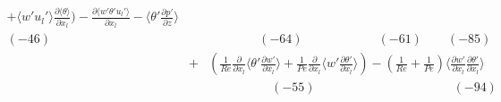 \documentclass[a4paper,11pt]{article}
\begin{document}
\begin{eqnarray}
+\langle w'u_l'\rangle \frac{\partial \langle \theta \rangle  }{\partial x_l})
-\frac{\partial \langle w'\theta'u_l'\rangle}{\partial x_l}  %
-\langle \theta' \frac{\partial p' }{\partial z}\rangle \nonumber \\
(-46) \quad{}   && \quad{} \qquad{} \quad{} (-64)\qquad{}\qquad{}\qquad{} (-61)\qquad{} (-85) \nonumber \\
&+&(\frac{1}{Re}\frac{\partial }{\partial x_l}\langle \theta' \frac{\partial w' }{\partial x_l}\rangle+\frac{1}{Pe}\frac{\partial }{\partial x_l}\langle w'\frac{\partial \theta' }{\partial x_l}\rangle) 
-(\frac{1}{Re}+\frac{1}{Pe})\langle \frac{\partial w' }{\partial x_l}\frac{\partial \theta' }{\partial x_l}\rangle \\
&& \quad{}\qquad{} \quad{} \quad{}(-55)\qquad{}\qquad{}\qquad{}\qquad{}\quad{}\qquad{} (-94) \nonumber 
\end{eqnarray}
\end{document}
